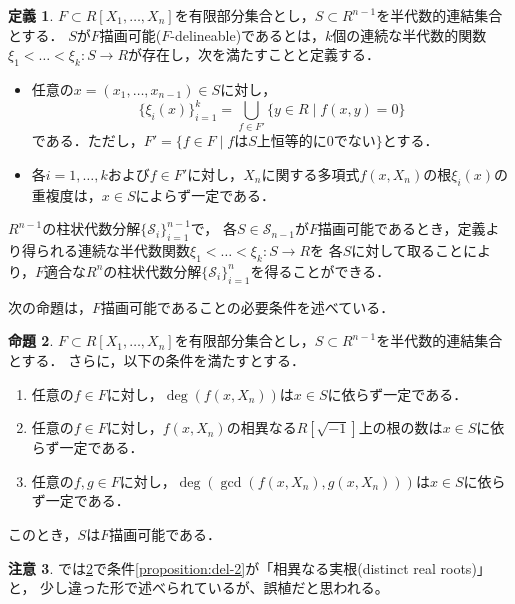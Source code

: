 \documentclass[uplatex, dvipdfmx]{jsarticle}
\numberwithin{equation}{section}
\newcommand{\map}[3]{{#1}\colon{#2}\rightarrow{#3}}
\theoremstyle{definition}
\newtheorem{definition}{定義}[section]
\newtheorem{proposition}[definition]{命題}
\newtheorem{remark}[definition]{注意}
\begin{document}
\begin{definition} 
     $F \subset R[X_1, \dots, X_n]$を有限部分集合とし，$S \subset R^{n-1}$を半代数的連結集合とする．
     $S$が$F$描画可能($F$-delineable)であるとは，$k$個の連続な半代数的関数$\map{\xi_1<\dots<\xi_k}{S}{R}$が存在し，次を満たすことと定義する．
     \begin{itemize}
          \item 任意の$ x = (x_1, \dots, x_{n-1}) \in S $に対し，
          \begin{equation}
               \{\xi_i(x)\}_{i=1}^k = \bigcup_{f \in F'}\{y \in R \mid f(x,y)=0\}
          \end{equation}
          である．ただし，$F' = \{f \in F \mid \text{$f$は$S$上恒等的に$0$でない}\}$とする．
          \item 各$i=1, \dots, k$および$f \in F'$に対し，$X_n$に関する多項式$f(x,X_n)$の根$\xi_i(x)$の重複度は，$x\in S$によらず一定である．
     \end{itemize}
\end{definition}

$R^{n-1}$の柱状代数分解$\{\mathcal{S}_i\}_{i=1}^{n-1}$で，
各$S \in \mathcal{S}_{n-1}$が$F$描画可能であるとき，定義より得られる連続な半代数関数$\map{\xi_1<\dots<\xi_k}{S}{R}$を
各$S$に対して取ることにより，$F$適合な$R^n$の柱状代数分解$\{\mathcal{S}_i\}_{i=1}^n$を得ることができる．

次の命題は，$F$描画可能であることの必要条件を述べている．

\begin{proposition}\label{proposition:del}
     $F \subset R[X_1, \dots, X_n]$を有限部分集合とし，$S \subset R^{n-1}$を半代数的連結集合とする．
     さらに，以下の条件を満たすとする．
     \begin{enumerate}
          \item \label{proposition:del-1}
          任意の$f \in F$に対し，$\deg(f(x, X_n))$は$x \in S$に依らず一定である．
          \item \label{proposition:del-2}
          任意の$f \in F$に対し，$f(x, X_n)$の相異なる$R[\sqrt{-1}]$上の根の数は$x \in S$に依らず一定である．
          \item \label{proposition:del-3}
          任意の$f, g \in F$に対し，$\deg(\gcd(f(x, X_n), g(x, X_n)))$は$x \in S$に依らず一定である．
     \end{enumerate}
     このとき，$S$は$F$描画可能である．
\end{proposition}

\begin{remark}
     \cite[Proposition 5.14]{MR2248869}では\cref{proposition:del}で条件\ref{proposition:del-2}が「相異なる実根(distinct real roots)」と，
     少し違った形で述べられているが、誤植だと思われる。
\end{remark}
\end{document}
